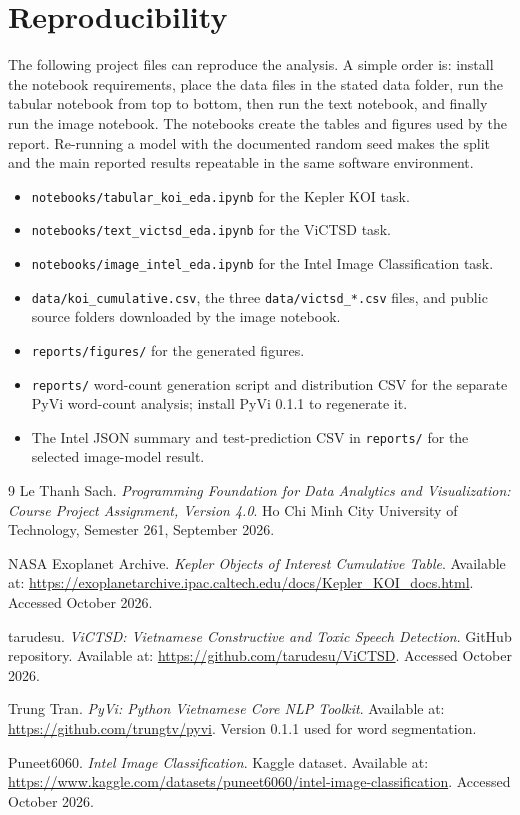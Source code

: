 \documentclass[oneside]{hcmut-report}
\begin{document}
\section*{Reproducibility}
The following project files can reproduce the analysis. A simple order is: install the notebook requirements, place the data files in the stated data folder, run the tabular notebook from top to bottom, then run the text notebook, and finally run the image notebook. The notebooks create the tables and figures used by the report. Re-running a model with the documented random seed makes the split and the main reported results repeatable in the same software environment.
\begin{itemize}[leftmargin=5mm]
  \item \texttt{notebooks/tabular\_koi\_eda.ipynb} for the Kepler KOI task.
  \item \texttt{notebooks/text\_victsd\_eda.ipynb} for the ViCTSD task.
  \item \texttt{notebooks/image\_intel\_eda.ipynb} for the Intel Image Classification task.
  \item \texttt{data/koi\_cumulative.csv}, the three \texttt{data/victsd\_*.csv} files, and public source folders downloaded by the image notebook.
  \item \texttt{reports/figures/} for the generated figures.
  \item \texttt{reports/} word-count generation script and distribution CSV for the separate PyVi word-count analysis; install PyVi 0.1.1 to regenerate it.
  \item The Intel JSON summary and test-prediction CSV in \texttt{reports/} for the selected image-model result.
\end{itemize}

\clearpage
\begin{thebibliography}{9}
Le Thanh Sach. \textit{Programming Foundation for Data Analytics and Visualization: Course Project Assignment, Version 4.0}. Ho Chi Minh City University of Technology, Semester 261, September 2026.

NASA Exoplanet Archive. \textit{Kepler Objects of Interest Cumulative Table}. Available at: \url{https://exoplanetarchive.ipac.caltech.edu/docs/Kepler_KOI_docs.html}. Accessed October 2026.

tarudesu. \textit{ViCTSD: Vietnamese Constructive and Toxic Speech Detection}. GitHub repository. Available at: \url{https://github.com/tarudesu/ViCTSD}. Accessed October 2026.

Trung Tran. \textit{PyVi: Python Vietnamese Core NLP Toolkit}. Available at: \url{https://github.com/trungtv/pyvi}. Version 0.1.1 used for word segmentation.

Puneet6060. \textit{Intel Image Classification}. Kaggle dataset. Available at: \url{https://www.kaggle.com/datasets/puneet6060/intel-image-classification}. Accessed October 2026.

\end{thebibliography}
\end{document}
